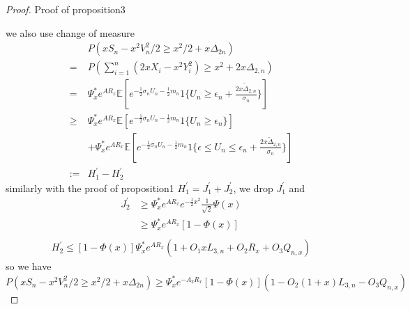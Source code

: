 \documentclass[bj,authoryear]{imsart}
\numberwithin{equation}{section}
\theoremstyle{plain}
\theoremstyle{definition}
\begin{document}
\begin{proof} Proof of proposition3

  we also use change of measure
  \begin{equation}
    \begin{aligned}
      &P(xS_n-x^2V_{n}^{2}/2\geq x^2/2+x\Delta_{2n})\\
      =&P(\sum_{i=1}^{n}(2xX_i-x^2Y_i^2)\geq x^2+2x\Delta_{2,n})\\
      =&\Psi_{x}^{*}e^{AR_x}\mathbb{E} [e^{-\frac{1}{2}\sigma_nU_n-\frac{1}{2}m_n}1\{U_n\geq \epsilon_n+\frac{2x\tilde{\Delta}_{2,n}}{\sigma_n}\}]\\
      \geq &\Psi_{x}^{*}e^{AR_x}\mathbb{E} [e^{-\frac{1}{2}\sigma_nU_n-\frac{1}{2}m_n}1\{U_n\geq \epsilon_n\}]\\
      &+\Psi_{x}^{*}e^{AR_x}\mathbb{E} [e^{-\frac{1}{2}\sigma_nU_n-\frac{1}{2}m_n}1\{\epsilon \leq U_n\leq \epsilon_n+\frac{2x\tilde{\Delta}_{2,n}}{\sigma_n}\}]\\
      :=& H_1^{'}-H_{2}^{'}
    \end{aligned}
  \end{equation}
  similarly with the proof of proposition1 $H_{1}^{'} = J_{1}^{'}+J_{2}^{'}$, we drop $J_{1}^{'}$ and 
  \begin{equation}
    \begin{aligned}
      J_{2}^{'}&\geq \Psi_{x}^{*}e^{AR_x}e^{-\frac{1}{2}x^2}\frac{1}{\sqrt{2}}\Psi(x)\\
      &\geq \Psi_{x}^{*}e^{AR_x}[1-\Phi(x)]\\
    \end{aligned}
  \end{equation}
  \begin{equation}
    \begin{aligned}
      H_{2}^{'}\leq [1-\Phi(x)]\Psi_{x}^{*}e^{AR_x}(1+O_1xL_{3,n}+O_2R_x+O_3Q_{n,x})
    \end{aligned}
  \end{equation}
  so we have 
  $$P(xS_n-x^2V_{n}^{2}/2\geq x^2/2+x\Delta_{2n})\geq \Psi_{x}^{*}e^{-A_2R_x}[1-\Phi(x)](1-O_2(1+x)L_{3,n}-O_3Q_{n,x})$$
\end{proof}



\end{document}
